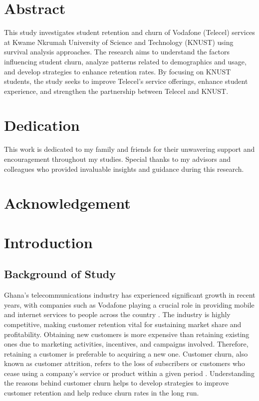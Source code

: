 \documentclass[12pt]{report}
\begin{document}
 
\newpage
\chapter*{Abstract}
This study investigates student retention and churn of Vodafone (Telecel) services at Kwame Nkrumah University of Science and Technology (KNUST) using survival analysis approaches. The research aims to understand the factors influencing student churn, analyze patterns related to demographics and usage, and develop strategies to enhance retention rates. By focusing on KNUST students, the study seeks to improve Telecel's service offerings, enhance student experience, and strengthen the partnership between Telecel and KNUST.

\newpage
\chapter*{Dedication}
This work is dedicated to my family and friends for their unwavering support and encouragement throughout my studies. Special thanks to my advisors and colleagues who provided invaluable insights and guidance during this research.

\newpage
\chapter*{Acknowledgement}

\newpage
\tableofcontents

\newpage
\listoffigures

\newpage
\listoftables


\newpage
\chapter{Introduction}

\section{Background of Study}

Ghana's telecommunications industry has experienced significant growth in recent years, with companies such as Vodafone playing a crucial role in providing mobile and internet services to people across the country \cite{bandim2022}. The industry is highly competitive, making customer retention vital for sustaining market share and profitability. Obtaining new customers is more expensive than retaining existing ones due to marketing activities, incentives, and campaigns involved. Therefore, retaining a customer is preferable to acquiring a new one. Customer churn, also known as customer attrition, refers to the loss of subscribers or customers who cease using a company’s service or product within a given period \cite{koranchirath2024}. Understanding the reasons behind customer churn helps to develop strategies to improve customer retention and help reduce churn rates in the long run.
\end{document}
